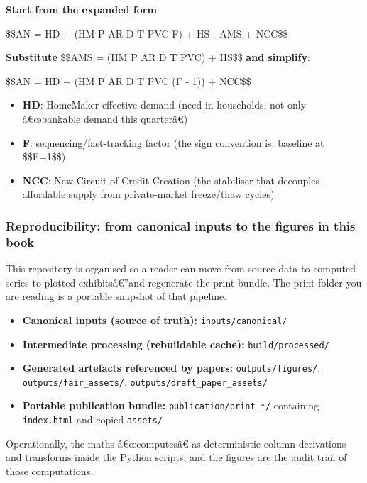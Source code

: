 \textbf{Start from the expanded form}:

\$\$AN = HD + (HM \cdot P \cdot AR \cdot D \cdot T \cdot PVC \cdot F) +
HS - AMS + NCC\$\$

\textbf{Substitute} \$\$AMS = (HM \cdot P \cdot AR \cdot D \cdot T
\cdot PVC) + HS\$\$ \textbf{and simplify}:

\$\$AN = HD + (HM \cdot P \cdot AR \cdot D \cdot T \cdot PVC \cdot (F -
1)) + NCC\$\$

\begin{itemize}
\tightlist
\item
  \textbf{HD}: HomeMaker effective demand (need in households, not only
  â€œbankable demand this quarterâ€)
\item
  \textbf{F}: sequencing/fast-tracking factor (the sign convention is:
  baseline at \$\$F=1\$\$)
\item
  \textbf{NCC}: New Circuit of Credit Creation (the stabiliser that
  decouples affordable supply from private-market freeze/thaw cycles)
\end{itemize}

\protect{}\label{repo-structure}
\subsubsection{Reproducibility: from canonical inputs to the figures in
this
book}\label{reproducibility-from-canonical-inputs-to-the-figures-in-this-book}

This repository is organised so a reader can move from source data to
computed series to plotted exhibitsâ€''and regenerate the print bundle.
The print folder you are reading is a portable snapshot of that
pipeline.

\begin{itemize}
\tightlist
\item
  \textbf{Canonical inputs (source of truth):}
  \texttt{inputs/canonical/}
\item
  \textbf{Intermediate processing (rebuildable cache):}
  \texttt{build/processed/}
\item
  \textbf{Generated artefacts referenced by papers:}
  \texttt{outputs/figures/}, \texttt{outputs/fair\_assets/},
  \texttt{outputs/draft\_paper\_assets/}
\item
  \textbf{Portable publication bundle:} \texttt{publication/print\_*/}
  containing \texttt{index.html} and copied \texttt{assets/}
\end{itemize}

Operationally, the maths â€œcomputesâ€ as deterministic column
derivations and transforms inside the Python scripts, and the figures
are the audit trail of those computations.

